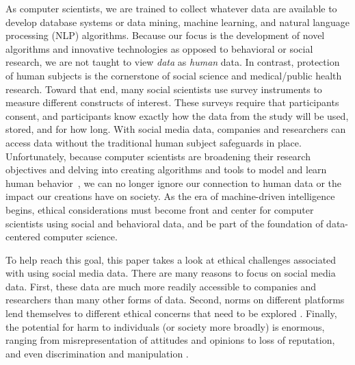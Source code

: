 \documentclass[11pt]{article} %
\begin{document}
As computer scientists, we are trained to collect whatever data are available to develop database systems or data mining, machine learning, and natural language processing (NLP) algorithms. Because our focus is the development of novel algorithms and innovative technologies as opposed to behavioral or social research, we are not taught to view \textit{data} as \textit{human} data. In contrast, protection of human subjects is the cornerstone of social science and medical/public health research. Toward that end, many social scientists use survey instruments to measure different constructs of interest. These surveys require that participants consent, and participants know exactly how the data from the study will be used, stored, and for how long. With social media data, companies and researchers can access data without the traditional human subject safeguards in place. Unfortunately, because computer scientists are broadening their research objectives and delving into creating algorithms and tools to model and learn human behavior~\cite{Kramer8788,fb_Analytica}, we can no longer ignore our connection to human data or the impact our creations have on society. As the era of machine-driven intelligence begins, ethical considerations must become front and center for computer scientists using social and behavioral data, and be part of the foundation of data-centered computer science. 

To help reach this goal, this paper takes a look at ethical challenges associated with using social media data. There are many reasons to focus on social media data. First, these data are much more readily accessible to companies and researchers than many other forms of data. Second, norms on different platforms lend themselves to different ethical concerns that need to be explored \cite{ozkula2020}. Finally, the potential for harm to individuals (or society more broadly) is enormous, ranging from misrepresentation of attitudes and opinions to loss of reputation, and even discrimination and manipulation \cite{10.1080/15265161.2019.1602190,Susser2018, kammourieh2017, luka2017}. 
\end{document}
